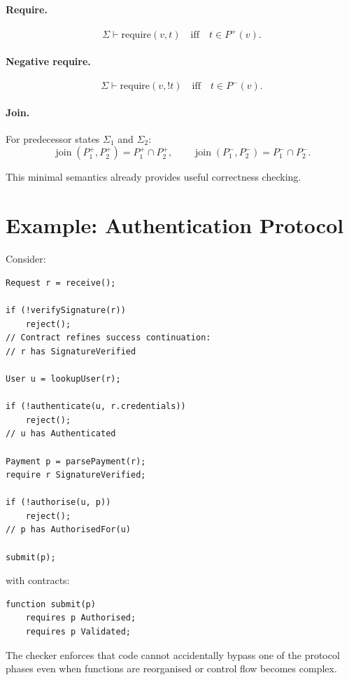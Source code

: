 \documentclass[11pt]{article}
\begin{document}
\paragraph{Require.}
\[
\Sigma \vdash \mathrm{require}(v,t)
\quad\text{iff}\quad t \in P^+(v).
\]

\paragraph{Negative require.}
\[
\Sigma \vdash \mathrm{require}(v,!t)
\quad\text{iff}\quad t \in P^-(v).
\]

\paragraph{Join.}
For predecessor states $\Sigma_1$ and $\Sigma_2$:
\[
\operatorname{join}(P_1^+,P_2^+) = P_1^+ \cap P_2^+,
\qquad
\operatorname{join}(P_1^-,P_2^-) = P_1^- \cap P_2^-.
\]

This minimal semantics already provides useful correctness checking.

\section{Example: Authentication Protocol}
Consider:

\begin{lstlisting}
Request r = receive();

if (!verifySignature(r))
    reject();
// Contract refines success continuation:
// r has SignatureVerified

User u = lookupUser(r);

if (!authenticate(u, r.credentials))
    reject();
// u has Authenticated

Payment p = parsePayment(r);
require r SignatureVerified;

if (!authorise(u, p))
    reject();
// p has AuthorisedFor(u)

submit(p);
\end{lstlisting}

with contracts:

\begin{lstlisting}
function submit(p)
    requires p Authorised;
    requires p Validated;
\end{lstlisting}

The checker enforces that code cannot accidentally bypass one of the protocol phases even when functions are reorganised or control flow becomes complex.
\end{document}
